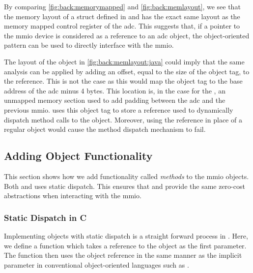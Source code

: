 By comparing \autoref{fig:back:memorymapped} and \autoref{fig:back:memlayout}, we see that the memory layout of a struct defined in {\rust} and {\C} has the exact same layout as the memory mapped control register of the \gls{adc}.
This suggests that, if a pointer to the \gls{mmio} device is considered as a reference to an \gls{adc} object, the object-oriented pattern can be used to directly interface with the \gls{mmio}.

The layout of the {\Java} object in \autoref{fig:back:memlayout:java} could imply that the same analysis can be applied by adding an offset, equal to the size of the object tag, to the reference.
This is not the case as this would map the object tag to the base address of the \gls{adc} minus 4 bytes.
This location is, in the case for the {\gecko}, an unmapped memory section used to add padding between the \gls{adc} and the previous \gls{mmio}.
{\Java} uses this object tag to store a reference used to dynamically dispatch method calls to the object.
Moreover, using the reference in place of a regular {\Java} object would cause the method dispatch mechanism to fail.

\subsection{Adding Object Functionality}

This section shows how we add functionality called \emph{methods} to the \gls{mmio} objects.
Both {\C} and {\rust} uses static dispatch.
This ensures that {\C} and {\rust} provide the same zero-cost abstractions when interacting with the \gls{mmio}.

\subsubsection{Static Dispatch in C}

Implementing objects with static dispatch is a straight forward process in {\C}.
Here, we define a function which takes a reference to the object as the first parameter.
The function then uses the object reference in the same manner as the implicit  parameter in conventional object-oriented languages such as {\Java}.

